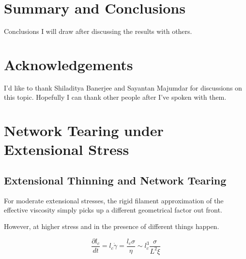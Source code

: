 \documentclass[pre,preprint]{revtex4-1}
\begin{document}
\section{Summary and Conclusions}
Conclusions I will draw after discussing the results with others.





















\section{Acknowledgements}
I'd like to thank Shiladitya Banerjee and Sayantan Majumdar for discussions on this topic.  Hopefully I can thank other people after I've spoken with them.

















\appendix
\addappheadtotoc




\section{Network Tearing under Extensional Stress}


\subsection{Extensional Thinning and Network Tearing}

For moderate extensional stresses, the rigid filament approximation of the effective viscosity simply picks up a different geometrical factor out front.  

However, at higher stress and in the presence of different things happen.

\begin{equation}
\frac{\partial l_c}{dt}=l_c\dot \gamma =\frac{l_c \sigma}{\eta}\sim l_c^3\frac{ \sigma}{L^2 \xi}
\end{equation}
\end{document}
